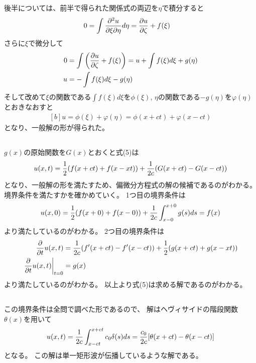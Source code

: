 \documentclass[../ap_2011.tex]{subfiles}
\begin{document}
後半については、前半で得られた関係式の両辺を\(\eta\)で積分すると
\begin{equation}\begin{aligned}[b]
    0&=\int\pdv[2]{u}{\xi}{\eta}d\eta = \pdv{u}{\zeta}+f(\xi)
\end{aligned}\end{equation}
さらに\(\xi\)で微分して
\begin{equation}\begin{aligned}[b]
    0&=\int\qty(\pdv{u}{\zeta}+f(\xi))=u+\int f(\xi)d\xi +g(\eta)\\
    u &=-\int f(\xi)d\xi -g(\eta)
\end{aligned}\end{equation}
そして改めて\(\xi\)の関数である\(\int f(\xi)d\xi\)を\(\phi(\xi)\),
\(\eta\)の関数である\(-g(\eta)\)を\(\varphi(\eta)\)とおきなおすと
\begin{equation}\begin{aligned}[b]
    u = \phi(\xi)+\varphi(\eta) = \phi(x+ct)+\varphi(x-ct)
\end{aligned}\end{equation}
となり、一般解の形が得られた。

\subsection{}
\(g(x)\)の原始関数を\(G(x)\)とおくと式(5)は
\begin{equation}\begin{aligned}[b]
    u(x,t)=\frac{1}{2}\qty(f(x+ct)+f(x-xt))+\frac{1}{2c}\qty(G(x+ct)-G(x-ct))
\end{aligned}\end{equation}
となり、一般解の形を満たすため、偏微分方程式の解の候補であるのがわかる。
境界条件を満たすかを確かめていく。
1つ目の境界条件は
\begin{equation}\begin{aligned}[b]
    u(x,0)=\frac{1}{2}\qty(f(x+0)+f(x-0))+\frac{1}{2c}\int_{x-0}^{x+0}g(s)ds=f(x)
\end{aligned}\end{equation}
より満たしているのがわかる。
2つ目の境界条件は
\begin{equation}\begin{aligned}[b]
    \pdv{t}u(x,t)&=\frac{1}{2c}\qty(f'(x+ct)-f'(x-ct))+\frac{1}{2}\qty(g(x+ct)+g(x-xt))\\
    \left.\pdv{t}u(x,t)\right|_{t=0}&=g(x)\\
\end{aligned}\end{equation}
より満たしているのがわかる。
以上より式(5)は求める解であるのがわかる。

\subsection{}
この境界条件は全問で調べた形であるので、
解はヘヴィサイドの階段関数\(\theta(x)\)を用いて
\begin{equation}\begin{aligned}[b]
    u(x,t)=\frac{1}{2c}\int_{x-ct}^{x+ct}c_0\delta(s)ds = \frac{c_0}{2c}\qty[\theta(x+ct)-\theta(x-ct)]
\end{aligned}\end{equation}
となる。
この解は単一矩形波が伝播しているような解である。
\end{document}
